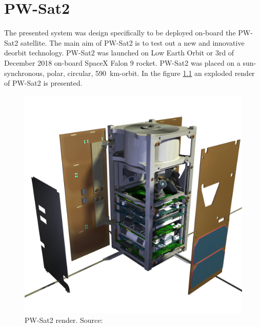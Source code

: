 \chapter{PW-Sat2}
The presented system was design specifically to be deployed on-board the PW-Sat2 satellite.  The main aim of PW-Sat2 is to test out a new and innovative deorbit technology. PW-Sat2 was launched on Low Earth Orbit or 3rd of December 2018 on-board SpaceX Falon 9 rocket. PW-Sat2 was placed on a sun-synchronous, polar, circular, \SI{590}{\kilo\meter}-orbit.
In the figure \ref{PW-Sat_render_01} an exploded render of PW-Sat2 is presented.
\begin{figure}
    \centering
    \includegraphics[width=0.65\paperwidth]{img/2/PW-Sat2_render_01.png}
    \caption{PW-Sat2 render. Source: \cite{PW_sat2_photo}}
    \label{PW-Sat_render_01}
\end{figure}


